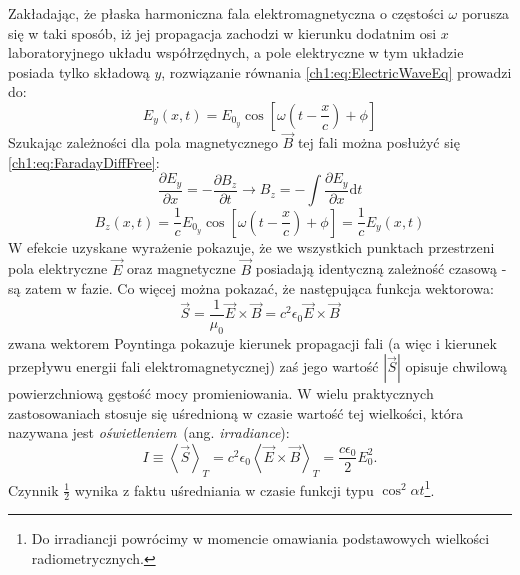 Zakładając, że płaska harmoniczna fala elektromagnetyczna o częstości $\omega$ porusza się w taki sposób, iż jej propagacja zachodzi w kierunku dodatnim osi $x$ laboratoryjnego układu współrzędnych, a pole elektryczne w tym układzie posiada tylko składową $y$, rozwiązanie równania \eqref{ch1:eq:ElectricWaveEq} prowadzi do:
\begin{equation}
E_y(x,t)=E_{0_y}\cos\left[\omega\left(t - \frac{x}{c} \right) + \phi \right]
\label{ch1:eq:EyRealRefraction}
\end{equation}
Szukając zależności dla pola magnetycznego $\vec{B}$ tej fali można posłużyć się \eqref{ch1:eq:FaradayDiffFree}:
\begin{equation}
\frac{\partial E_y}{\partial x} = -\frac{\partial B_z}{\partial t} \rightarrow B_z = -\int\frac{\partial E_y}{\partial x}\mathrm{d}t
\end{equation}
\begin{equation}
B_z(x,t)=\frac{1}{c}E_{0_y}\cos\left[\omega\left(t - \frac{x}{c} \right) + \phi \right]=\frac{1}{c}E_y(x,t)
\label{ch1:eq:EBRelationship}
\end{equation}
W efekcie uzyskane wyrażenie pokazuje, że we wszystkich punktach przestrzeni pola elektryczne $\vec{E}$ oraz magnetyczne $\vec{B}$ posiadają identyczną zależność czasową - są zatem w fazie. Co więcej można pokazać, że następująca funkcja wektorowa:
\begin{equation}
\vec{S} = \frac{1}{\mu_0}\vec{E}\times\vec{B} = c^2\epsilon_0\vec{E}\times\vec{B}
\label{ch1:eq:PoyntingVector}
\end{equation}
zwana wektorem Poyntinga pokazuje kierunek propagacji fali (a więc i kierunek przepływu energii fali elektromagnetycznej) zaś jego wartość $|\vec{S}|$ opisuje chwilową powierzchniową gęstość mocy promieniowania. W wielu praktycznych zastosowaniach stosuje się uśrednioną w czasie wartość tej wielkości, która nazywana jest \textit{oświetleniem}~(ang. \textit{irradiance}):
\begin{equation}
I\equiv\left\langle \vec{S} \right\rangle_T = c^2\epsilon_0\left\langle \vec{E}\times\vec{B} \right\rangle_T = \frac{c\epsilon_0}{2}E_{0}^2.
\label{ch1:eq:Irradiance}
\end{equation}
Czynnik $\frac{1}{2}$ wynika z faktu uśredniania w czasie funkcji typu $\cos^2\alpha t$\footnote{Do irradiancji powrócimy w momencie omawiania podstawowych wielkości radiometrycznych.}.

